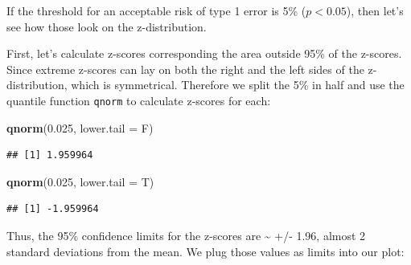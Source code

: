 \documentclass[]{book}
\newenvironment{Shaded}{\begin{snugshade}}{\end{snugshade}}
\newcommand{\DataTypeTok}[1]{\textcolor[rgb]{0.13,0.29,0.53}{#1}}
\newcommand{\FloatTok}[1]{\textcolor[rgb]{0.00,0.00,0.81}{#1}}
\newcommand{\KeywordTok}[1]{\textcolor[rgb]{0.13,0.29,0.53}{\textbf{#1}}}
\newcommand{\NormalTok}[1]{#1}
\begin{document}
If the threshold for an acceptable risk of type 1 error is 5\% (\(p < 0.05\)), then let's see how those look on the z-distribution.

First, let's calculate z-scores corresponding the area outside 95\% of the z-scores. Since extreme z-scores can lay on both the right and the left sides of the z-distribution, which is symmetrical. Therefore we split the 5\% in half and use the quantile function \texttt{qnorm} to calculate z-scores for each:

\begin{Shaded}
\begin{Highlighting}[]
\KeywordTok{qnorm}\NormalTok{(}\FloatTok{0.025}\NormalTok{, }\DataTypeTok{lower.tail =}\NormalTok{ F)}
\end{Highlighting}
\end{Shaded}

\begin{verbatim}
## [1] 1.959964
\end{verbatim}

\begin{Shaded}
\begin{Highlighting}[]
\KeywordTok{qnorm}\NormalTok{(}\FloatTok{0.025}\NormalTok{, }\DataTypeTok{lower.tail =}\NormalTok{ T)}
\end{Highlighting}
\end{Shaded}

\begin{verbatim}
## [1] -1.959964
\end{verbatim}

Thus, the 95\% confidence limits for the z-scores are \textasciitilde{} +/- 1.96, almost 2 standard deviations from the mean. We plug those values as limits into our plot:
\end{document}

